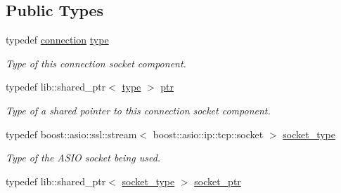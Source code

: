\subsection*{Public Types}
\begin{DoxyCompactItemize}
\item 
typedef \hyperlink{classwebsocketpp_1_1transport_1_1asio_1_1tls__socket_1_1connection}{connection} \hyperlink{classwebsocketpp_1_1transport_1_1asio_1_1tls__socket_1_1connection_a13b5aceec8084df22fbce516365e1dc8}{type}\hypertarget{classwebsocketpp_1_1transport_1_1asio_1_1tls__socket_1_1connection_a13b5aceec8084df22fbce516365e1dc8}{}\label{classwebsocketpp_1_1transport_1_1asio_1_1tls__socket_1_1connection_a13b5aceec8084df22fbce516365e1dc8}

\begin{DoxyCompactList}\small\item\em Type of this connection socket component. \end{DoxyCompactList}\item 
typedef lib\+::shared\+\_\+ptr$<$ \hyperlink{classwebsocketpp_1_1transport_1_1asio_1_1tls__socket_1_1connection_a13b5aceec8084df22fbce516365e1dc8}{type} $>$ \hyperlink{classwebsocketpp_1_1transport_1_1asio_1_1tls__socket_1_1connection_a2aa605c27a476eba644e062dc5bc4f6d}{ptr}\hypertarget{classwebsocketpp_1_1transport_1_1asio_1_1tls__socket_1_1connection_a2aa605c27a476eba644e062dc5bc4f6d}{}\label{classwebsocketpp_1_1transport_1_1asio_1_1tls__socket_1_1connection_a2aa605c27a476eba644e062dc5bc4f6d}

\begin{DoxyCompactList}\small\item\em Type of a shared pointer to this connection socket component. \end{DoxyCompactList}\item 
typedef boost\+::asio\+::ssl\+::stream$<$ boost\+::asio\+::ip\+::tcp\+::socket $>$ \hyperlink{classwebsocketpp_1_1transport_1_1asio_1_1tls__socket_1_1connection_ae99cd7b29da2c13b29709c2b901b545d}{socket\+\_\+type}\hypertarget{classwebsocketpp_1_1transport_1_1asio_1_1tls__socket_1_1connection_ae99cd7b29da2c13b29709c2b901b545d}{}\label{classwebsocketpp_1_1transport_1_1asio_1_1tls__socket_1_1connection_ae99cd7b29da2c13b29709c2b901b545d}

\begin{DoxyCompactList}\small\item\em Type of the A\+S\+IO socket being used. \end{DoxyCompactList}\item 
typedef lib\+::shared\+\_\+ptr$<$ \hyperlink{classwebsocketpp_1_1transport_1_1asio_1_1tls__socket_1_1connection_ae99cd7b29da2c13b29709c2b901b545d}{socket\+\_\+type} $>$ \hyperlink{classwebsocketpp_1_1transport_1_1asio_1_1tls__socket_1_1connection_a340a92078a69e44d79996c7d2f9f7aa2}{socket\+\_\+ptr}\hypertarget{classwebsocketpp_1_1transport_1_1asio_1_1tls__socket_1_1connection_a340a92078a69e44d79996c7d2f9f7aa2}{}\label{classwebsocketpp_1_1transport_1_1asio_1_1tls__socket_1_1connection_a340a92078a69e44d79996c7d2f9f7aa2}


\end{DoxyCompactItemize}
